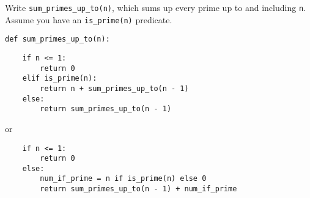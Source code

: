 \question Write {\tt sum\_primes\_up\_to(n)}, which sums up every prime up to
and including {\tt n}.  Assume you have an {\tt is\_prime(n)} predicate.

\begin{lstlisting}
def sum_primes_up_to(n):
\end{lstlisting}
\begin{solution}[2.1in]
\begin{lstlisting}
    if n <= 1:
        return 0
    elif is_prime(n):
        return n + sum_primes_up_to(n - 1)
    else:
        return sum_primes_up_to(n - 1)
\end{lstlisting}
or
\begin{lstlisting}
    if n <= 1:
        return 0
    else:
        num_if_prime = n if is_prime(n) else 0
        return sum_primes_up_to(n - 1) + num_if_prime
\end{lstlisting}
\end{solution}
